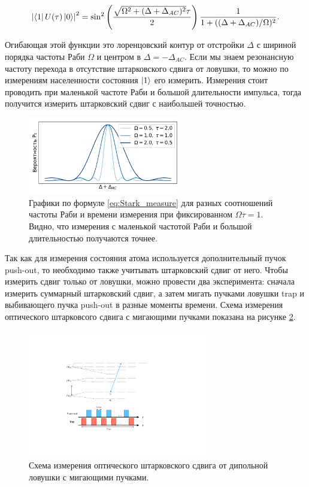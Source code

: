 \begin{equation}
	\left|\left\langle 1 \right|U(\tau)\left| 0 \right\rangle\right|^2 = \sin^2\left(\frac{\sqrt{\Omega^2+(\Delta+\Delta_{AC})^2}\tau}{2}\right)\frac{1}{1+((\Delta+\Delta_{AC})/\Omega)^2}.
	\label{eq:Stark_measure}
\end{equation}

Огибающая этой функции это лоренцовский контур от отстройки $\Delta$ с шириной порядка частоты Раби $\Omega$ и центром в $\Delta = -\Delta_{AC}$. Если мы знаем резонансную частоту перехода в отсутствие штарковского сдвига от ловушки, то можно по измерениям населенности состояния $\left| 1 \right\rangle$ его измерить. Измерения стоит проводить при маленькой частоте Раби и большой длительности импульса, тогда получится измерить штарковский сдвиг с наибольшей точностью. 

\begin{figure}[ht]
	\centering
	\includegraphics[width=0.6\textwidth]{images/Stark_measure_drawing.pdf}
	\caption{Графики по формуле \ref{eq:Stark_measure} для разных соотношений частоты Раби и времени измерения при фиксированном $\Omega\tau = 1$. Видно, что измерения с маленькой частотой Раби и большой длительностью получаются точнее.}
	\label{fig:Stark_drawing}
\end{figure}

Так как для измерения состояния атома используется дополнительный пучок push-out, то необходимо также учитывать штарковский сдвиг от него. Чтобы измерить сдвиг только от ловушки, можно провести два эксперимента: сначала измерить суммарный штарковский сдвиг, а затем мигать пучками ловушки trap и выбивающего пучка push-out в разные моменты времени. Схема измерения оптического штарковсого сдвига с мигающими пучками показана на рисунке \ref{fig:Stark_measure_scheme}.

\begin{figure}[ht]
	\centering
	\includegraphics[width=0.7\textwidth]{images/measurement.pdf}
	\caption{Схема измерения оптического штарковского сдвига от дипольной ловушки с мигающими пучками.}
	\label{fig:Stark_measure_scheme}
\end{figure}

